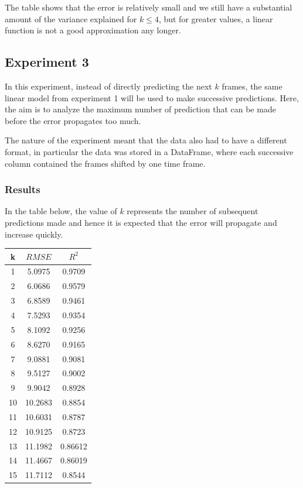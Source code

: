 \documentclass[a4paper]{article}
\begin{document}
  The table shows that the error is relatively small and we still have a substantial amount of the variance explained for $k \leq 4$, but for greater values, a linear function is not a good approximation any longer.

  \subsection{Experiment 3}
  In this experiment, instead of directly predicting the next $k$ frames, the same linear model from experiment 1 will be used to make successive predictions. Here, the aim is to analyze the maximum number of prediction that can be made before the error propagates too much.

  The nature of the experiment meant that the data also had to have a different format, in particular the data was stored in a DataFrame, where each successive column contained the frames shifted by one time frame.

  \subsubsection{Results}
  In the table below, the value of $k$ represents the number of subsequent predictions made and hence it is expected that the error will propagate and increase quickly.

  \begin{center}
    \begin{tabular}{ |c|c|c| } 
     \hline
     k & $RMSE$ & $R^2$ \\
     \hline\hline
     1 & 5.0975 & 0.9709 \\
     2 & 6.0686 & 0.9579 \\
     3 & 6.8589 & 0.9461 \\
     4 & 7.5293 & 0.9354 \\
     5 & 8.1092 & 0.9256 \\
     6 & 8.6270 & 0.9165 \\
     7 & 9.0881 & 0.9081 \\
     8 & 9.5127 & 0.9002 \\
     9 & 9.9042 & 0.8928 \\
     10 & 10.2683 & 0.8854 \\
     11 & 10.6031 & 0.8787 \\
     12 & 10.9125 & 0.8723 \\
     13 & 11.1982 & 0.86612 \\
     14 & 11.4667 & 0.86019 \\
     15 & 11.7112 & 0.8544 \\
     \hline
    \end{tabular}
  \end{center}
\end{document}
